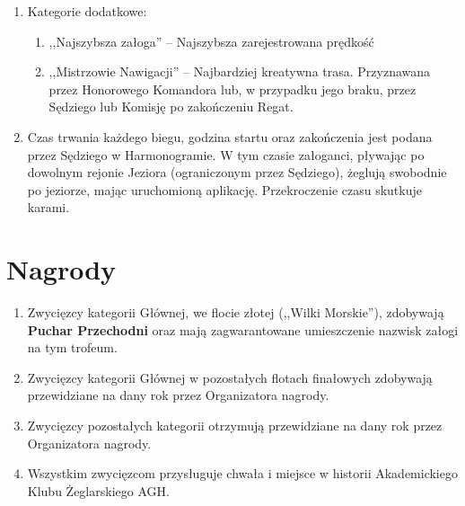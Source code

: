\documentclass[12pt,a4paper]{article}
\begin{document}
\begin{enumerate}
\begin{enumerate}
        \item W każdej \textit{Flocie} załogi zajmują miejsca w zależności od długości przebytej trasy.
    \end{enumerate}
    \item Kategorie dodatkowe:
    \begin{enumerate}
        \item ,,Najszybsza załoga'' -- Najszybsza zarejestrowana prędkość
        \item ,,Mistrzowie Nawigacji'' -- Najbardziej kreatywna trasa. Przyznawana przez Honorowego Komandora lub, w przypadku jego braku, przez Sędziego lub Komisję po zakończeniu Regat.
    \end{enumerate}
    \item Czas trwania każdego biegu, godzina startu oraz zakończenia jest podana przez Sędziego w Harmonogramie. W tym czasie załoganci, pływając po dowolnym rejonie Jeziora (ograniczonym przez Sędziego), żeglują swobodnie po jeziorze, mając uruchomioną aplikację. Przekroczenie czasu skutkuje karami.
\end{enumerate}



\section{Nagrody}
\begin{enumerate}
    \item Zwycięzcy kategorii Głównej, we flocie złotej (,,Wilki Morskie''), zdobywają \textbf{Puchar Przechodni} oraz mają zagwarantowane umieszczenie nazwisk załogi na tym trofeum.
    \item Zwycięzcy kategorii Głównej w pozostałych flotach finałowych zdobywają przewidziane na dany rok przez Organizatora nagrody.
    \item Zwycięzcy pozostałych kategorii otrzymują przewidziane na dany rok przez Organizatora nagrody.
    \item Wszystkim zwycięzcom przysługuje chwała i miejsce w historii Akademickiego Klubu Żeglarskiego AGH. 
\end{enumerate}
\end{document}
